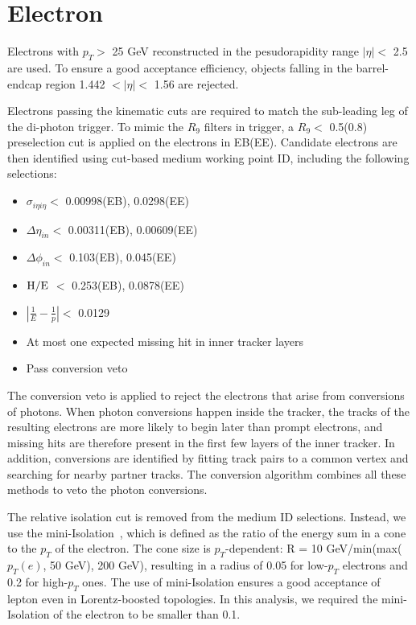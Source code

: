 \documentclass[thesis.tex]{subfiles}
\renewcommand\_{\textunderscore\allowbreak}
\begin{document}
\section{Electron}
\label{sec:electronID} 
Electrons with  $p_{T} >$ 25 GeV reconstructed in the pesudorapidity range $|\eta| <$ 2.5 are used. To ensure a good acceptance efficiency, objects falling in the barrel-endcap region 1.442 $< |\eta| <$ 1.56 are rejected. 

Electrons passing the kinematic cuts are required to match the sub-leading leg of the di-photon trigger. 
To mimic the $R_9$ filters in trigger, a $R_9 <$ 0.5(0.8) preselection cut is applied on the electrons in EB(EE). 
Candidate electrons are then identified using cut-based medium working point ID, including the following selections:

\begin{center}
\begin{itemize}
\item $\sigma_{i\eta i\eta} <$ 0.00998(EB), 0.0298(EE)
\item $\Delta\eta_{in} <$ 0.00311(EB), 0.00609(EE)
\item $\Delta\phi_{in} <$ 0.103(EB), 0.045(EE)
\item $\mathrm{H/E}$ $<$ 0.253(EB), 0.0878(EE)
\item $|\frac{1}{E} - \frac{1}{p}| <$ 0.0129
\item At most one expected missing hit in inner tracker layers
\item Pass conversion veto
\end{itemize}
\end{center}

The conversion veto is applied to reject the electrons that arise from conversions of photons.
When photon conversions happen inside the tracker, the tracks of the resulting electrons are more likely to begin later than prompt electrons, and missing hits are therefore present in the first few layers of the inner tracker. 
In addition, conversions are identified by fitting track pairs to a common vertex and searching for nearby partner tracks.
The conversion algorithm combines all these methods to veto the photon conversions.

The relative isolation cut is removed from the medium ID selections. 
Instead, we use the mini-Isolation~\cite{CMS:Isolation}, which is defined as the ratio of the energy sum in a cone to the $p_T$ of the electron.
The cone size is $p_T$-dependent: R = 10 GeV/min(max($p_T(e)$, 50 GeV), 200 GeV), resulting in a radius of 0.05 for low-$p_T$ electrons and 0.2 for high-$p_T$ ones. 
The use of mini-Isolation ensures a good acceptance of lepton even in Lorentz-boosted topologies.
In this analysis, we required the mini-Isolation of the electron to be smaller than 0.1. 
\end{document}
